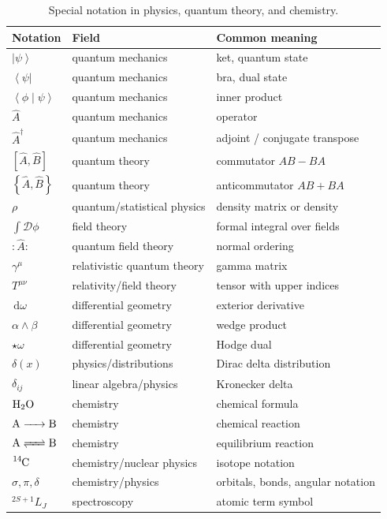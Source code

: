\documentclass[11pt,twocolumn]{article}
\newcommand{\dd}{\,\mathrm{d}}
\newcommand{\ket}[1]{\left|#1\right\rangle}
\newcommand{\bra}[1]{\left\langle#1\right|}
\newcommand{\braket}[2]{\left\langle #1 \middle| #2 \right\rangle}
\newcommand{\qop}[1]{\hat{#1}}
\newcommand{\commutator}[2]{\left[#1,#2\right]}
\newcommand{\anticommutator}[2]{\left\{#1,#2\right\}}
\newcommand{\normalorder}[1]{:\!#1\!:}
\begin{document}
\begin{table}[t]
\centering
\caption{Special notation in physics, quantum theory, and chemistry.}
\begin{tabular}{lll}
\toprule
Notation & Field & Common meaning \\
\midrule
$\ket{\psi}$ & quantum mechanics & ket, quantum state \\
$\bra{\psi}$ & quantum mechanics & bra, dual state \\
$\braket{\phi}{\psi}$ & quantum mechanics & inner product \\
$\qop{A}$ & quantum mechanics & operator \\
$\qop{A}^{\dagger}$ & quantum mechanics & adjoint / conjugate transpose \\
$\commutator{\qop{A}}{\qop{B}}$ & quantum theory & commutator \(AB-BA\) \\
$\anticommutator{\qop{A}}{\qop{B}}$ & quantum theory & anticommutator \(AB+BA\) \\
$\rho$ & quantum/statistical physics & density matrix or density \\
$\int\mathcal{D}\phi$ & field theory & formal integral over fields \\
$\normalorder{\qop{A}}$ & quantum field theory & normal ordering \\
$\gamma^\mu$ & relativistic quantum theory & gamma matrix \\
$T^{\mu\nu}$ & relativity/field theory & tensor with upper indices \\
$\dd\omega$ & differential geometry & exterior derivative \\
$\alpha\wedge\beta$ & differential geometry & wedge product \\
$\star\omega$ & differential geometry & Hodge dual \\
$\delta(x)$ & physics/distributions & Dirac delta distribution \\
$\delta_{ij}$ & linear algebra/physics & Kronecker delta \\
$\ce{H2O}$ & chemistry & chemical formula \\
$\ce{A -> B}$ & chemistry & chemical reaction \\
$\ce{A <=> B}$ & chemistry & equilibrium reaction \\
$\ce{^{14}C}$ & chemistry/nuclear physics & isotope notation \\
$\sigma,\pi,\delta$ & chemistry/physics & orbitals, bonds, angular notation \\
${}^{2S+1}L_J$ & spectroscopy & atomic term symbol \\
\bottomrule
\end{tabular}
\end{table}
\end{document}
